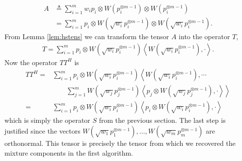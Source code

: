 \documentclass[aos,preprint]{imsart}
\def\l{\left}
\def\r{\right}
\theoremstyle{plain}
\theoremstyle{defintion}
\begin{document}
\begin{align*}
	A 
	&\triangleq \sum_{i=1}^m w_i p_i \otimes  W\l(p_i^{\otimes m-1}\r)\otimes W\l( p_{i}^{\otimes m-1}\r) \\
	&= \sum_{i=1}^m  p_i \otimes  W\l(\sqrt{w_i}p_i^{\otimes m-1}\r)\otimes W\l(\sqrt{w_i} p_{i}^{\otimes m-1}\r).
\end{align*}
From Lemma \ref{lem:hstens} we can transform the tensor $A$ into the operator $T$,
\begin{eqnarray}\label{eqn:T}
	T = \sum_{i=1}^m  p_i \otimes W\l( \sqrt{w_i} p_{i}^{\otimes m-1}\r)\l<W\l(\sqrt{w_i}p_i^{\otimes m-1}\r),\cdot\r>  .
\end{eqnarray}
Now the operator $TT^H$ is
\begin{align*}
	TT^H =  &\sum_{i=1}^m  p_i \otimes W\l( \sqrt{w_i} p_{i}^{\otimes m-1}\r)\l<W\l(\sqrt{w_i}p_i^{\otimes m-1}\r),\cdots \r.\\
		       &\qquad \l.\sum_{j=1}^m   W\l( \sqrt{w_j} p_{j}^{\otimes m-1}\r)\l<p_j \otimes W\l(\sqrt{w_j}p_j^{\otimes m-1}\r),\cdot\r>\r> \\
	=  &\sum_{i=1}^m  p_i \otimes W\l( \sqrt{w_i} p_{i}^{\otimes m-1}\r)\l<p_i \otimes W\l(\sqrt{w_i}p_i^{\otimes m-1}\r),\cdot\r> 
\end{align*}
which is simply the operator $S$ from the previous section.
The last step is justified since the vectors $W\left( \sqrt{w_1} p_1^{\otimes m-1} \right),\ldots, W\left( \sqrt{w_m} p_m^{\otimes m-1} \right)$ are orthonormal.
This tensor is precisely the tensor from which we recovered the mixture components in the first algorithm.
\end{document}
